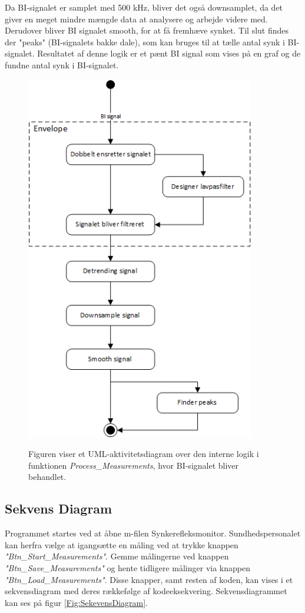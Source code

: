 Da BI-signalet er samplet med 500 kHz, bliver det også downsamplet, da det giver en meget mindre mængde data at analysere og arbejde videre med. Derudover bliver BI signalet smooth, for at få fremhæve synket. Til slut findes der "peaks" (BI-signalets bakke dale), som kan bruges til at tælle antal synk i BI-signalet. Resultatet af denne logik er et pænt BI signal som vises på en graf og de fundne antal synk i BI-signalet. 

\begin{figure}[H]
\centering
{\includegraphics[width=10cm]
{Figure/designSWenvelope}}
\caption{Figuren viser et UML-aktivitetsdiagram over den interne logik i funktionen \textit{Process\_Measurements}, hvor BI-signalet bliver behandlet. }
\label{fig:designSWenvelope}
\end{figure}


\subsection{Sekvens Diagram}

Programmet startes ved at åbne m-filen Synkerefleksmonitor. Sundhedspersonalet kan herfra vælge at igangsætte en måling ved at trykke knappen \textit{"Btn\_Start\_Measurements"}. Gemme målingerne ved knappen \textit{"Btn\_Save\_Measurements"} og hente tidligere målinger via knappen \textit{"Btn\_Load\_Measurements"}. Disse knapper, samt resten af koden, kan vises i et sekvensdiagram med deres rækkefølge af kodeeksekvering. Sekvensdiagrammet kan ses på figur \ref{Fig:SekevensDiagram}.


